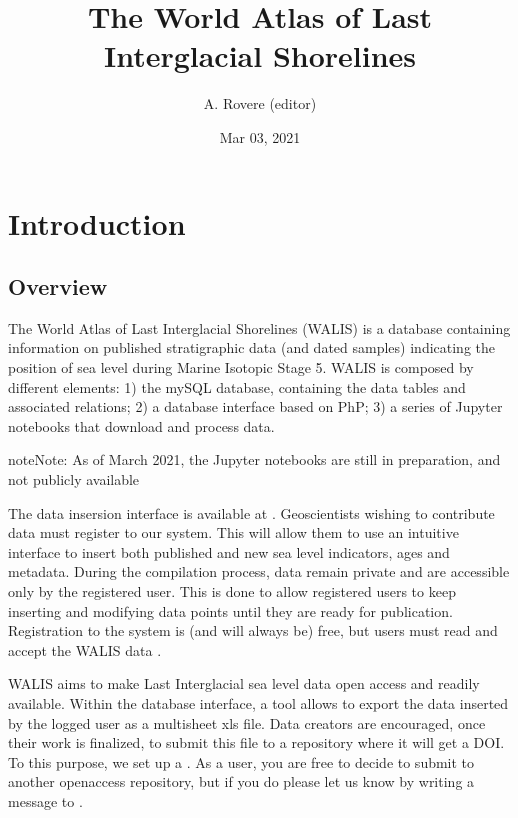\documentclass[letterpaper,10pt,english]{sphinxmanual}
\title{The World Atlas of Last Interglacial Shorelines}
\date{Mar 03, 2021}
\author{A.\@{} Rovere (editor)}
\begin{document}
\pagestyle{empty}
\sphinxmaketitle
\pagestyle{plain}
\sphinxtableofcontents
\pagestyle{normal}
\label{\detokenize{index::doc}}



\chapter{Introduction}
\label{\detokenize{first:introduction}}\label{\detokenize{first::doc}}

\section{Overview}
\label{\detokenize{first:overview}}
The World Atlas of Last Interglacial Shorelines (WALIS) is a database containing information on published stratigraphic data (and dated samples) indicating the position of sea level during Marine Isotopic Stage 5. WALIS is composed by different elements: 1) the mySQL database, containing the data tables and associated relations; 2) a database interface based on PhP; 3) a series of Jupyter notebooks that download and process data.

\begin{sphinxadmonition}{note}{Note:}
As of March 2021, the Jupyter notebooks are still in preparation, and not publicly available
\end{sphinxadmonition}

The data insersion interface is available at . Geoscientists wishing to contribute data must register to our system. This will allow them to use an intuitive interface to insert both published and new sea level indicators, ages and metadata. During the compilation process, data remain private and are accessible only by the registered user. This is done to allow registered users to keep inserting and modifying data points until they are ready for publication. Registration to the system is (and will always be) free, but users must read and accept the WALIS data .

WALIS aims to make Last Interglacial sea level data open access and readily available. Within the database interface, a tool allows to export the data inserted by the logged user as a multi\sphinxhyphen{}sheet xls file. Data creators are encouraged, once their work is finalized, to submit this file to a repository where it will get a DOI. To this purpose, we set up a . As a user, you are free to decide to submit to another open\sphinxhyphen{}access repository, but if you do please let us know by writing a message to .
\end{document}
